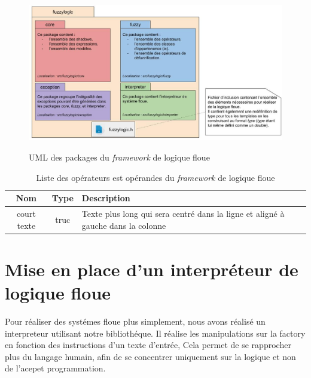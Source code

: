 \documentclass[a4paper,11pt]{article}
\begin{document}
    \begin{figure}[H]
        \begin{center}
            \caption{UML des packages du \textit{framework} de logique floue}
            \includegraphics[scale=0.51]{assets/Packages_(UML).jpg}
            \label{fig:umlPackage}
        \end{center}
    \end{figure}


    \begin{table}[H]
        \caption{Liste des opérateurs est opérandes du \textit{framework} de logique floue}
        \label{tab:listing}

        \begin{center}
            \begin{tabular}{|c|c|M{4cm}|}
                \hline
                Nom & Type & Description \tabularnewline
                \hline
                court texte & truc & Texte plus long qui sera centré dans la ligne et aligné à gauche dans la colonne  \tabularnewline
                \hline
            \end{tabular}
        \end{center}
    \end{table}

    \section{Mise en place d'un interpréteur de logique floue}

    Pour réaliser des systémes floue plus simplement, nous avons réalisé un interpreteur utilisant notre bibliothéque.
    Il réalise les manipulations sur la factory en fonction des instructions d'un texte d'entrée,
    Cela permet de se rapprocher plus du langage humain, afin de se concentrer uniquement sur la logique et non de l'acepet programmation.
\end{document}
